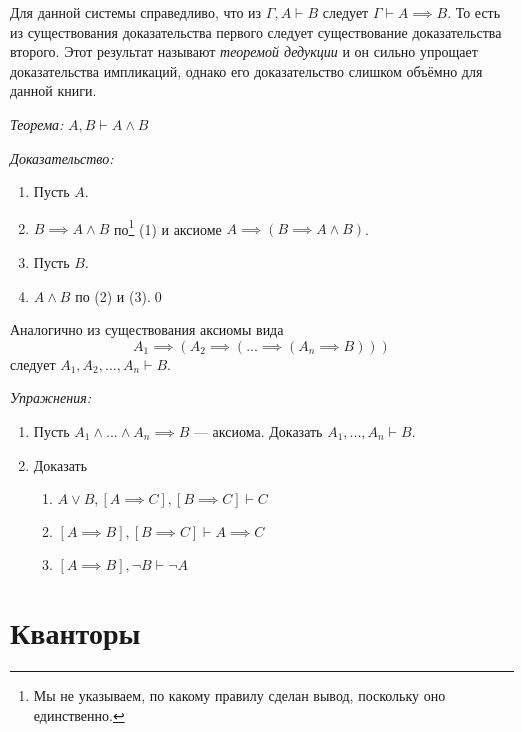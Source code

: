 Для данной системы справедливо,
что из $\Gamma,A\vdash B$ следует ${\Gamma\vdash A\implies B}$.
То есть из существования доказательства первого следует
существование доказательства второго.
Этот результат называют {\it теоремой дедукции} и он сильно упрощает
доказательства импликаций, однако его доказательство
слишком объёмно для данной книги.

{\it Теорема:} $A,B\vdash A\land B$

{\it Доказательство:}
\begin{enumerate}[label=(\arabic*)]
  \item{}Пусть $A$.
  \item{}$B\implies A\land B$ по\footnote{Мы не указываем, по
    какому правилу сделан вывод, поскольку оно единственно.}
  (1) и аксиоме $A\implies (B\implies A\land B)$.
  \item{}Пусть $B$.
  \item{}$A\land B$ по (2) и (3).\qed
\end{enumerate}

Аналогично из существования аксиомы вида
\[
  A_1\implies (A_2\implies (...\implies (A_{n}\implies B)))
\]
следует $A_1,A_2,...,A_{n}\vdash B$.

\vspace{1em}
{\it Упражнения:}
\begin{enumerate}
  \item{}Пусть $A_1\land...\land A_{n}\implies B$ --- аксиома.
  Доказать $A_1,...,A_{n}\vdash B$.
  \item{}Доказать
  \begin{enumerate}
    \item{}$A\lor B,[A\implies C],[B\implies C]\vdash C$
    \item{}$[A\implies B],[B\implies C]\vdash A\implies C$
    \item{}$[A\implies B],\lnot B\vdash\lnot A$
  \end{enumerate}
\end{enumerate}

\section{Кванторы}

